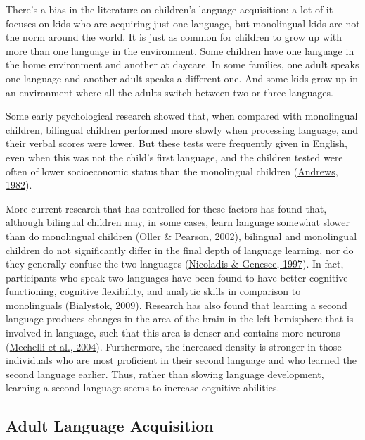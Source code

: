 \documentclass[
]{krantz}
\begin{document}
There's a bias in the literature on children's language acquisition: a lot of it focuses on kids who are acquiring just one language, but monolingual kids are not the norm around the world. It is just as common for children to grow up with more than one language in the environment. Some children have one language in the home environment and another at daycare. In some families, one adult speaks one language and another adult speaks a different one. And some kids grow up in an environment where all the adults switch between two or three languages.

Some early psychological research showed that, when compared with monolingual children, bilingual children performed more slowly when processing language, and their verbal scores were lower. But these tests were frequently given in English, even when this was not the child's first language, and the children tested were often of lower socioeconomic status than the monolingual children (\protect\hyperlink{ref-Andrews1982}{Andrews, 1982}).

More current research that has controlled for these factors has found that, although bilingual children may, in some cases, learn language somewhat slower than do monolingual children (\protect\hyperlink{ref-Oller2002}{Oller \& Pearson, 2002}), bilingual and monolingual children do not significantly differ in the final depth of language learning, nor do they generally confuse the two languages (\protect\hyperlink{ref-Nicoladis1997}{Nicoladis \& Genesee, 1997}). In fact, participants who speak two languages have been found to have better cognitive functioning, cognitive flexibility, and analytic skills in comparison to monolinguals (\protect\hyperlink{ref-Bialystok2009}{Bialystok, 2009}). Research has also found that learning a second language produces changes in the area of the brain in the left hemisphere that is involved in language, such that this area is denser and contains more neurons (\protect\hyperlink{ref-Mechelli2004}{Mechelli et al., 2004}). Furthermore, the increased density is stronger in those individuals who are most proficient in their second language and who learned the second language earlier. Thus, rather than slowing language development, learning a second language seems to increase cognitive abilities.

\hypertarget{adult-language-acquisition}{%
\subsection*{Adult Language Acquisition}\label{adult-language-acquisition}}
\end{document}

